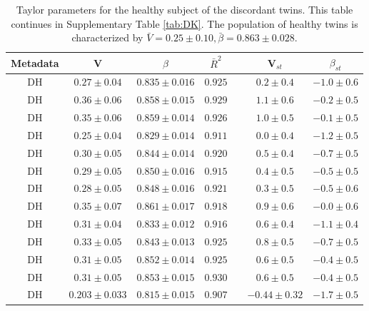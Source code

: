 \documentclass[12pt,oneside,letterpaper]{article}
\begin{document}
 \begin{table} 
  \begin{center}
    \begin{tabular}{ccccccc}
	    \hline
		Metadata&V&$\beta$&$\bar{R}^2$&&V$_{st}$&$\beta_{st}$\\
		\hline
		DH&$0.27 \pm 0.04$&$0.835 \pm 0.016$&$0.925$&&$0.2 \pm 0.4$&$-1.0 \pm 0.6$\\
		DH&$0.36 \pm 0.06$&$0.858 \pm 0.015$&$0.929$&&$1.1 \pm 0.6$&$-0.2 \pm 0.5$\\
		DH&$0.35 \pm 0.06$&$0.859 \pm 0.014$&$0.926$&&$1.0 \pm 0.5$&$-0.1 \pm 0.5$\\
		DH&$0.25 \pm 0.04$&$0.829 \pm 0.014$&$0.911$&&$0.0 \pm 0.4$&$-1.2 \pm 0.5$\\
		DH&$0.30 \pm 0.05$&$0.844 \pm 0.014$&$0.920$&&$0.5 \pm 0.4$&$-0.7 \pm 0.5$\\
		DH&$0.29 \pm 0.05$&$0.850 \pm 0.016$&$0.915$&&$0.4 \pm 0.5$&$-0.5 \pm 0.5$\\
		DH&$0.28 \pm 0.05$&$0.848 \pm 0.016$&$0.921$&&$0.3 \pm 0.5$&$-0.5 \pm 0.6$\\
		DH&$0.35 \pm 0.07$&$0.861 \pm 0.017$&$0.918$&&$0.9 \pm 0.6$&$-0.0 \pm 0.6$\\
		DH&$0.31 \pm 0.04$&$0.833 \pm 0.012$&$0.916$&&$0.6 \pm 0.4$&$-1.1 \pm 0.4$\\
		DH&$0.33 \pm 0.05$&$0.843 \pm 0.013$&$0.925$&&$0.8 \pm 0.5$&$-0.7 \pm 0.5$\\
		DH&$0.31 \pm 0.05$&$0.852 \pm 0.014$&$0.925$&&$0.6 \pm 0.5$&$-0.4 \pm 0.5$\\
		DH&$0.31 \pm 0.05$&$0.853 \pm 0.015$&$0.930$&&$0.6 \pm 0.5$&$-0.4 \pm 0.5$\\
		DH&$0.203 \pm 0.033$&$0.815 \pm 0.015$&$0.907$&&$-0.44 \pm 0.32$&$-1.7 \pm 0.5$\\
		\hline
    \end{tabular}
  \end{center}
  \caption{Taylor parameters for the healthy subject of the discordant twins\cite{kwashiorkor}. This table continues in Supplementary Table \ref{tab:DK}. The population of healthy twins is characterized by $\bar{V} = 0.25 \pm 0.10, \bar{\beta} = 0.863 \pm 0.028$.}
  \label{tab:DH}
\end{table}
\end{document}
